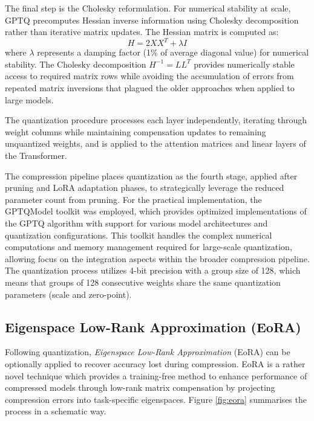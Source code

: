 The final step is the Cholesky reformulation. For numerical stability at scale, GPTQ precomputes Hessian inverse information using Cholesky decomposition rather than iterative matrix updates. The Hessian matrix is computed as:
\begin{equation}
H = 2XX^T + \lambda I
\end{equation}
where $\lambda$ represents a damping factor (1\% of average diagonal value) for numerical stability. The Cholesky decomposition $H^{-1} = LL^T$ provides numerically stable access to required matrix rows while avoiding the accumulation of errors from repeated matrix inversions that plagued the older approaches when applied to large models.

The quantization procedure processes each layer independently, iterating through weight columns while maintaining compensation updates to remaining unquantized weights, and is applied to the attention matrices and linear layers of the Transformer.

The compression pipeline places quantization as the fourth stage, applied after pruning and LoRA adaptation phases, to strategically leverage the reduced parameter count from pruning. For the practical implementation, the GPTQModel toolkit \cite{gptqmodel} was employed, which provides optimized implementations of the GPTQ algorithm with support for various model architectures and quantization configurations. This toolkit handles the complex numerical computations and memory management required for large-scale quantization, allowing focus on the integration aspects within the broader compression pipeline. The quantization process utilizes 4-bit precision with a group size of 128, which means that groups of 128 consecutive weights share the same quantization parameters (scale and zero-point).

\subsection{Eigenspace Low-Rank Approximation (EoRA)} \label{eora}

Following quantization, \textit{Eigenspace Low-Rank Approximation} (EoRA) \cite{eora} can be optionally applied to recover accuracy lost during compression. EoRA is a rather novel technique which provides a training-free method to enhance performance of compressed models through low-rank matrix compensation by projecting compression errors into task-specific eigenspaces. Figure \ref{fig:eora} summarises the process in a schematic way.


